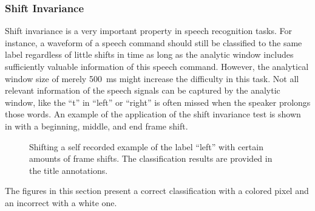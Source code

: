 \subsubsection{Shift Invariance}
Shift invariance is a very important property in speech recognition tasks. 
For instance, a waveform of a speech command should still be classified to the same label regardless of little shifts in time as long as the analytic window includes sufficiently valuable information of this speech command.
However, the analytical window size of merely \SI{500}{\milli\second} might increase the difficulty in this task.
Not all relevant information of the speech signals can be captured by the analytic window, like the \enquote{t} in \enquote{left} or \enquote{right} is often missed when the speaker prolongs those words.
An example of the application of the shift invariance test is shown in  with a beginning, middle, and end frame shift.
\begin{figure}[!ht]
  \centering
    \quad
  \caption{Shifting a self recorded example of the label \enquote{left} with certain amounts of frame shifts. The classification results are provided in the title annotations.}
  \label{fig:exp_details_tb_shift_left}
\end{figure}
\FloatBarrier
\noindent
The figures in this section present a correct classification with a colored pixel and an incorrect with a white one.
